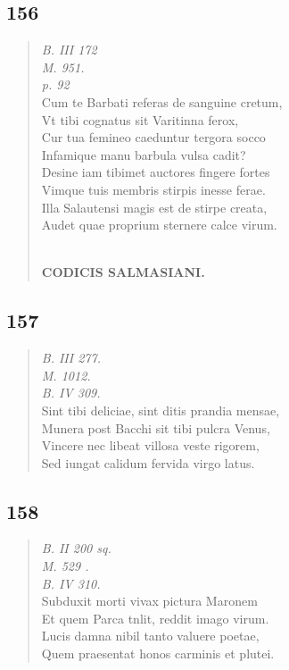 \documentclass[11pt, a4paper]{report}
\begin{document}
            \subsection*{156}
      \begin{verse}
      \textit{B. III 172} \\ \textit{M. 951.} \\ \textit{p. 92} \\ Cum te Barbati referas de sanguine cretum, \\ Vt tibi cognatus sit Varitinna ferox, \\ Cur tua femineo caeduntur tergora socco \\ Infamique manu barbula vulsa cadit? \\ Desine iam tibimet auctores fingere fortes \\ Vimque tuis membris stirpis inesse ferae. \\ Illa Salautensi magis est de stirpe creata, \\ Audet quae proprium sternere calce virum. \\ 
        ﻿\pagebreak 
    \begin{center} \textbf{CODICIS SALMASIANI.} \end{center} \marginpar{[147]} 
      \end{verse}
  
            \subsection*{157}
      \begin{verse}
      \textit{B. III 277.} \\ \textit{M. 1012.} \\ \textit{B. IV 309.} \\ Sint tibi deliciae, sint ditis prandia mensae, \\ Munera post Bacchi sit tibi pulcra Venus, \\ Vincere nec libeat villosa veste rigorem, \\ Sed iungat calidum fervida virgo latus. \\ 
      \end{verse}
  
            \subsection*{158}
      \begin{verse}
      \textit{B. II 200 sq.} \\ \textit{M. 529 .} \\ \textit{B. IV 310.} \\ Subduxit morti vivax pictura Maronem \\ Et quem Parca tnlit, reddit imago virum. \\ Lucis damna nibil tanto valuere poetae, \\ Quem praesentat honos carminis et plutei. \\ 
      \end{verse}
  
\end{document}
